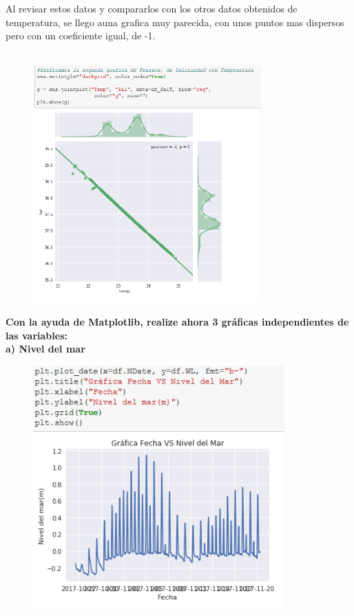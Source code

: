 \documentclass[12pt]{article}
\begin{document}
Al revisar estos datos y compararlos con los otros datos obtenidos de temperatura, se llego auna grafica muy parecida, con unos puntos mas dispersos pero con un coeficiente igual, de -1. \\ \\

\begin{figure}[h]
    \centering
\includegraphics[width=3.45in]{Pearson3.png}
\end{figure}

\noindent\textbf {Con la ayuda de Matplotlib, realize ahora 3 gráficas independientes de las variables: } \\

\noindent\textbf {a) Nivel del mar} \\
\begin{figure}[h!]
    \centering
\includegraphics[width=3.8in]{GrafF1.png}
\end{figure}
\end{document}
